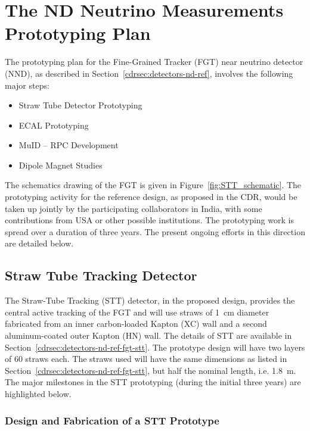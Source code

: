 
\section{The ND Neutrino Measurements Prototyping Plan} 
\label{sec:proto-nd-nnd}


The prototyping plan for the Fine-Grained Tracker (FGT) near neutrino detector (NND), as 
described in Section~\ref{cdrsec:detectors-nd-ref}, involves the following major steps:
\begin{itemize} 
\item Straw Tube Detector Prototyping
\item ECAL Prototyping
\item MuID -- RPC Development 
\item Dipole Magnet Studies
\end{itemize} 

The schematics drawing of the FGT is given in
Figure~\ref{fig:STT_schematic}. The prototyping activity for the
reference design, as proposed in the CDR, would be taken up jointly by
the participating collaborators in India, with some contributions from
USA or other possible institutions.  The prototyping work is spread
over a duration of three years. The present ongoing efforts in this
direction are detailed below.

\subsection{Straw Tube Tracking Detector} 

The Straw-Tube Tracking (STT) detector, in the proposed design,
provides the central active tracking of the FGT and will use straws of
1~cm diameter fabricated from an inner carbon-loaded Kapton (XC) wall
and a second aluminum-coated outer Kapton (HN) wall. The details of
STT are available in
Section~\ref{cdrsec:detectors-nd-ref-fgt-stt}. The prototype design
will have two layers of 60 straws each.  The straws used will have the
same dimensions as listed in
Section~\ref{cdrsec:detectors-nd-ref-fgt-stt}, but half the nominal
length, i.e. 1.8~m. The major milestones in the STT prototyping
(during the initial three years) are highlighted below.

\subsubsection{Design and Fabrication of a STT Prototype} 

